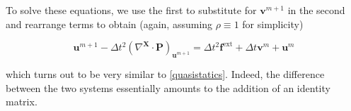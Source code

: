 \documentclass{article}
\begin{document}
To solve these equations, we use the first to substitute for \(\mathbf{v}^{m+1}\) in the second and rearrange terms to obtain (again, assuming \(\rho \equiv 1\) for simplicity)

\begin{equation}
\mathbf{u}^{m+1} - \Delta t^2 \left( \nabla^{\mathbf{X}} \cdot \mathbf{P} \right)_{\mathbf{u}^{m+1}} = \Delta t^2 \mathbf{f}^{\text{ext}} + \Delta t \mathbf{v}^m + \mathbf{u}^m
\end{equation}

which turns out to be very similar to \eqref{quasistatics}.  Indeed, the difference between the two systems essentially amounts to the addition of an identity matrix.
\end{document}
